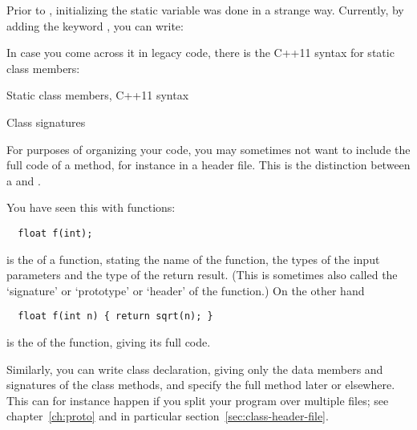 Prior to , initializing the static variable was
done in a strange way. Currently, by adding the keyword ,
you can write:


\begin{comment}
  \Level 1 {Static members}
  \begin{block}{Static class members}
    \label{sl:static-member}
    A static member acts as if it's shared between all objects.\\
    (Note: C++17 syntax)
    \snippetwithoutput{classstatic17}{link}{static17}
  \end{block}
\end{comment}

In case you come across it in legacy code,
there is the C++11 syntax for static class members:

\begin{block}{Static class members, C++11 syntax}
  \label{sl:static-member11}
  \lstset{style=snippetcode}
\end{block}

 {Class signatures}
\label{sec:class-decl-defn}

For purposes of organizing your code,
you may sometimes not want to include the full code of a method,
for instance in a header file.
This is the distinction between a 
and .

You have seen this with functions:
\begin{lstlisting}
  float f(int);
\end{lstlisting}
is the  of a function,
stating the name of the function, the types of the input parameters
and the type of the return result.
(This is sometimes also called the `signature' or `prototype' or `header'
of the function.)
On the other hand
\begin{lstlisting}
  float f(int n) { return sqrt(n); }
\end{lstlisting}
is the  of the function, giving its full code.

Similarly, you can write class declaration, giving only the
data members and signatures of the class methods,
and specify the full method later or elsewhere.
This can for instance happen if you split your program over multiple files;
see chapter~\ref{ch:proto} and in particular section~\ref{sec:class-header-file}.

